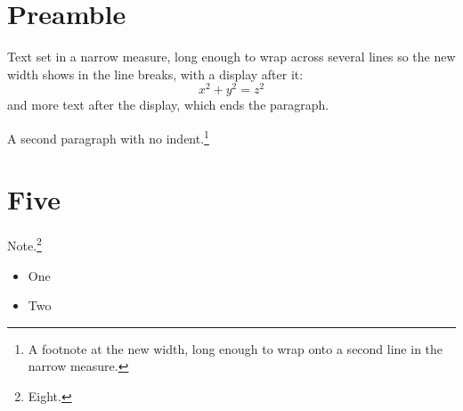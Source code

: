 \documentclass{article}
\begin{document}
\section{Preamble}
Text set in a narrow measure, long enough to wrap across several lines so the new width shows in the line breaks, with a display after it:
\[ x^2 + y^2 = z^2 \]
and more text after the display, which ends the paragraph.

\setlength{\parindent}{0pt}
A second paragraph with no indent.\footnote{A footnote at the new width, long enough to wrap onto a second line in the narrow measure.}
\setcounter{section}{4}
\section{Five}
\setcounter{footnote}{7}
Note.\footnote{Eight.}
\begin{itemize}\item One \item Two\end{itemize}
\end{document}
